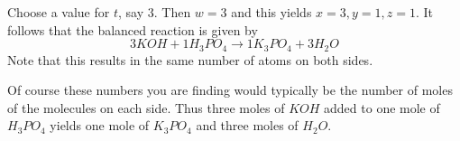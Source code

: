 \begin{solution}
Choose a value for $t$, say $3$. Then $w=3$ and this yields $x=3,y=1,z=1.$ It follows that the balanced
reaction is given by  
\begin{equation*}
3KOH+1H_{3}PO_{4}\rightarrow 1K_{3}PO_{4}+3H_{2}O
\end{equation*}
Note that this results in the same number of atoms on both sides.
\end{solution}

Of course these numbers you are finding would typically be the number of
moles of the molecules on each side. Thus three moles of $KOH$ added to one
mole of $H_{3}PO_{4}$ yields one mole of $K_{3}PO_{4}$ and three moles of 
$H_{2}O$.
